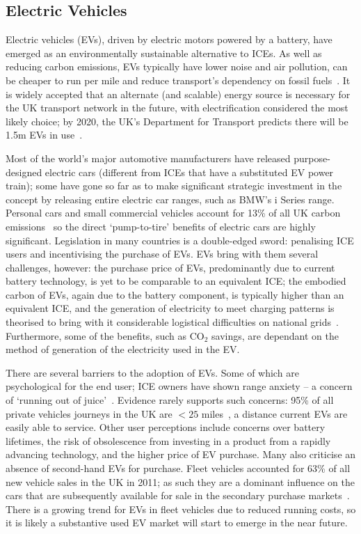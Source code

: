 \documentclass[b5paper,10pt]{article}
\begin{document}
\subsection{Electric Vehicles}

Electric vehicles (EVs), driven by electric motors powered by a
battery, have emerged as an environmentally sustainable alternative to
ICEs. As well as reducing carbon emissions, EVs typically have lower
noise and air pollution, can be cheaper to run per mile and reduce
transport's dependency on fossil fuels~\citep{postevs:2010}. It is
widely accepted that an alternate (and scalable) energy source is
necessary for the UK transport network in the future, with
electrification considered the most likely choice; by 2020, the UK's
Department for Transport predicts there will be 1.5m EVs in
use~\citep{dft:2008}.

Most of the world's major automotive manufacturers have released
purpose-designed electric cars (different from ICEs that have a
substituted EV power train); some have gone so far as to make
significant strategic investment in the concept by releasing entire
electric car ranges, such as BMW's i Series range. Personal cars and
small commercial vehicles account for 13\% of all UK carbon
emissions~\citep{lumsden:2012} so the direct `pump-to-tire' benefits of
electric cars are highly significant. Legislation in many countries is
a double-edged sword: penalising ICE users and incentivising the
purchase of EVs. EVs bring with them several challenges, however: the
purchase price of EVs, predominantly due to current battery
technology, is yet to be comparable to an equivalent ICE; the embodied
carbon of EVs, again due to the battery component, is typically higher
than an equivalent ICE, and the generation of electricity to meet
charging patterns is theorised to bring with it considerable
logistical difficulties on national
grids~\citep{su-et-al:2011,akhavan-rezai-et-al:2015}. Furthermore, some
of the benefits, such as CO$_2$ savings, are dependant on the method of
generation of the electricity used in the EV.

There are several barriers to the adoption of EVs. Some of which are
psychological for the end user; ICE owners have shown range anxiety --
a concern of `running out of
juice'~\citep{oflev:2011,yilmaz+krein:2012}. Evidence rarely supports
such concerns: 95\% of all private vehicles journeys in the UK are $<25$
miles~\citep{oflev:2011}, a distance current EVs are easily able to
service. Other user perceptions include concerns over battery
lifetimes, the risk of obsolescence from investing in a product from a
rapidly advancing technology, and the higher price of EV purchase.
Many also criticise an absence of second-hand EVs for purchase. Fleet
vehicles accounted for 63\% of all new vehicle sales in the UK in
2011; as such they are a dominant influence on the cars that are
subsequently available for sale in the secondary purchase
markets~\citep{fleets:2012}. There is a growing trend for EVs in fleet
vehicles due to reduced running costs, so it is likely a substantive
used EV market will start to emerge in the near future.
\end{document}
